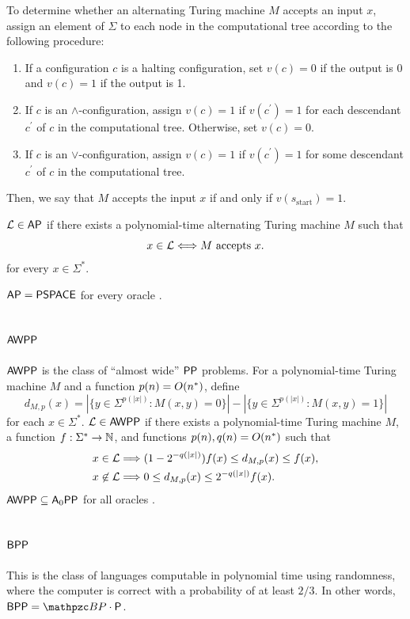To determine whether an alternating Turing machine $M$ accepts an input $x$,
assign an element of $\Sigma$ to each node in the computational tree according
to the following procedure:
\begin{enumerate}
\item If a configuration $c$ is a halting configuration, set $v(c)=0$ if the
  output is 0 and $v(c)=1$ if the output is 1.
\item If $c$ is an $\wedge$-configuration, assign $v(c)=1$ if $v(c^\prime)=1$
  for each descendant $c^\prime$ of $c$ in the computational tree. Otherwise,
  set $v(c)=0$.
\item If $c$ is an $\vee$-configuration, assign $v(c)=1$ if $v(c^\prime)=1$ for
  some descendant $c^\prime$ of $c$ in the computational tree.
\end{enumerate}
Then, we say that $M$ accepts the input $x$ if and only if
$v(s_{\text{start}})=1$.

$\mathcal{L}\in\mathsf{AP}$ if there exists a polynomial-time alternating Turing machine
$M$ such that
\[
x\in\mathcal{L}\Longleftrightarrow M\text{ accepts }x.
\]
for every $x\in\Sigma^*$.

$\mathsf{AP}=\mathsf{PSPACE}$ for every oracle \cite{chandra1981alternation}.

\subsection{$\mathsf{AWPP}$}

$\mathsf{AWPP}$ is the class of ``almost wide'' $\mathsf{PP}$ problems. For a 
polynomial-time Turing machine $M$ and a function $p(n)=O(n^*)$, define
\[
d_{M,p}(x)=|\{y\in\Sigma^{p(|x|)}:M(x,y)=0\}|-|\{y\in\Sigma^{p(|x|)}:M(x,y)=1\}|
\]
for each $x\in\Sigma^*$. $\mathcal{L}\in\mathsf{AWPP}$ if there exists a polynomial-time 
Turing machine $M$, a function $f:\Sigma^*\rightarrow\mathbb{N}$, and functions 
$p(n),q(n)=O(n^*)$ such that
\begin{align*}
x\in\mathcal{L}&\Longrightarrow(1-2^{-q(|x|)})f(x)\leq d_{M,p}(x)\leq f(x), \\
x\not\in\mathcal{L}&\Longrightarrow 0\leq d_{M,p}(x)\leq 2^{-q(|x|)}f(x).
\end{align*}
$\mathsf{AWPP}\subseteq\mathsf{A}_0\mathsf{PP}$ for all oracles \cite{vyalyi2003qma}.

\subsection{$\mathsf{BPP}$}

This is the class of languages computable in polynomial time using randomness, 
where the computer is correct with a probability of at least $2/3$. In other 
words, $\msf{BPP}=\cBP\cdot\sP$.

